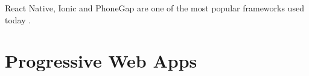 React Native, Ionic and PhoneGap are one of the most popular frameworks used today \cite{CrossPlatform_study}.









\section{Progressive Web Apps}
